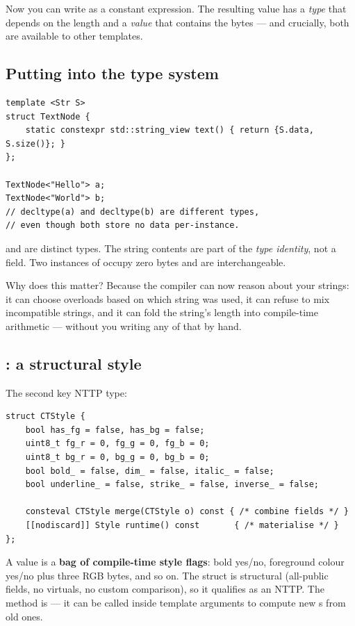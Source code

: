Now you can write  as a constant expression. The
resulting value has a \emph{type} that depends on the length and a
\emph{value} that contains the bytes --- and crucially, both are
available to other templates.

\subsection{Putting  into the type system}

\begin{lstlisting}
template <Str S>
struct TextNode {
    static constexpr std::string_view text() { return {S.data, S.size()}; }
};

TextNode<"Hello"> a;
TextNode<"World"> b;
// decltype(a) and decltype(b) are different types,
// even though both store no data per-instance.
\end{lstlisting}

 and  are distinct
types. The string contents are part of the \emph{type identity},
not a field. Two instances of  occupy zero
bytes and are interchangeable.

Why does this matter? Because the compiler can now reason about your
strings: it can choose overloads based on which string was used, it
can refuse to mix incompatible strings, and it can fold the string's
length into compile-time arithmetic --- without you writing any of
that by hand.

\subsection{: a structural style}

The second key NTTP type:

\begin{lstlisting}
struct CTStyle {
    bool has_fg = false, has_bg = false;
    uint8_t fg_r = 0, fg_g = 0, fg_b = 0;
    uint8_t bg_r = 0, bg_g = 0, bg_b = 0;
    bool bold_ = false, dim_ = false, italic_ = false;
    bool underline_ = false, strike_ = false, inverse_ = false;

    consteval CTStyle merge(CTStyle o) const { /* combine fields */ }
    [[nodiscard]] Style runtime() const       { /* materialise */ }
};
\end{lstlisting}

A  value is a \textbf{bag of compile-time style
flags}: bold yes/no, foreground colour yes/no plus three RGB bytes,
and so on. The struct is structural (all-public fields, no virtuals,
no custom comparison), so it qualifies as an NTTP. The
 method is  --- it can be called inside
template arguments to compute new s from old ones.

